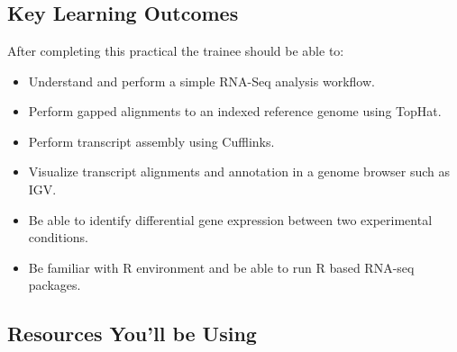 
\chapter{\moduleTitle}
\newpage

\section{Key Learning Outcomes}

After completing this practical the trainee should be able to:
\begin{itemize}
  \item Understand and perform a simple RNA-Seq analysis workflow.
  \item Perform gapped alignments to an indexed reference genome using TopHat.
  \item Perform transcript assembly using Cufflinks.
  \item Visualize transcript alignments and annotation in a genome browser such as IGV.
  \item Be able to identify differential gene expression between two experimental conditions.
  \item Be familiar with R environment and be able to run R based RNA-seq packages.
\end{itemize}

\section{Resources You'll be Using}
 

